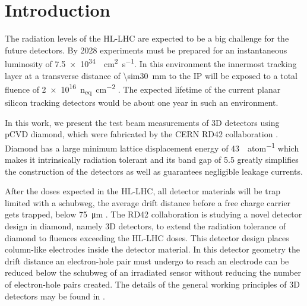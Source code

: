 \section{Introduction}
The radiation levels of the \ac{HL-LHC} are expected to be a big challenge for the future detectors. By 2028 experiments must be prepared for an instantaneous luminosity of \SI{7.5e34}{\per\centi\meter\squared\per\second}. In this environment the innermost tracking layer at a transverse distance of \SI{\sim30}{\milli\meter} to the \acl{IP} will be exposed to a total fluence of \SI{2e16}{n_{eq}\per\centi\meter^2} %
\cite{dose}. The expected lifetime of the current planar silicon tracking detectors would be about one year in such an environment.\par
In this work, we present the test beam measurements of 3D detectors using \ac{pCVD} diamond, which were fabricated by the CERN RD42 collaboration \cite{rd42}. Diamond has a large minimum lattice displacement energy of \SI{43}{\ev\per atom} \cite{koike} which makes it intrinsically radiation tolerant and its band gap of \SI{5.5}{\ev} greatly simplifies the construction of the detectors as well as guarantees negligible leakage currents.\par
After the doses expected in the \ac{HL-LHC}, all detector materials will be trap limited with a schubweg, the average drift distance before a free charge carrier gets trapped, below \SI{75}{\micro\meter} \cite{feick, wen2}. The RD42 collaboration is studying a novel detector design in diamond, namely 3D detectors, to extend the radiation tolerance of diamond to fluences exceeding the HL-LHC doses. This detector design places column-like electrodes inside the detector material. In this detector geometry the drift distance an electron-hole pair must undergo to reach an electrode can be reduced below the schubweg of an irradiated sensor without reducing the number of electron-hole pairs created. The details of the general working principles of 3D detectors may be found in \cite{parker}.
